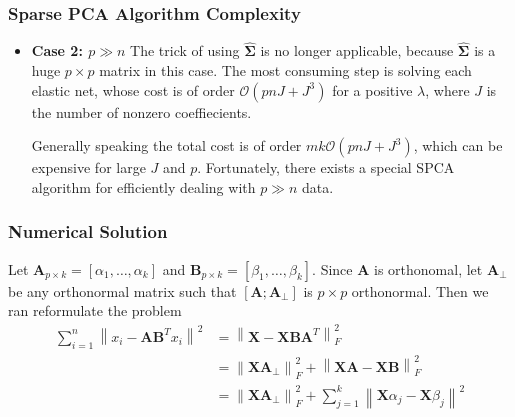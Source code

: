 \documentclass{beamer}
\theoremstyle{plain}
\theoremstyle{definition}
\newcommand{\mat}[1]{\mathbf{#1}}
\newcommand{\norm}[1]{\left\lVert #1 \right\rVert}
\begin{document}
\begin{frame}
\frametitle{Sparse PCA Algorithm Complexity}
\begin{itemize}
\item \textbf{Case 2: $p \gg n$}\linebreak
The trick of using $\hat{\mat \Sigma}$ is no longer applicable, because $\hat{\mat \Sigma}$ is a huge $p \times p$ matrix in this case. The most consuming step is solving each elastic net, whose cost is of order $\mathcal{O}(pnJ + J^3)$ for a positive $\lambda$, where $J$ is the number of nonzero coeffiecients.

Generally speaking the total cost is of order $mk\mathcal{O}(pnJ+J^3)$, which can be expensive for large $J$ and $p$. Fortunately, there exists a special SPCA algorithm for efficiently dealing with $p \gg n$ data.
\end{itemize}
\end{frame}

\begin{frame}
\frametitle{Numerical Solution}
Let $\mat{A}_{p \times k} = \left[ \alpha_1, \ldots , \alpha_k\right]$ and $\mat{B}_{p \times k} = \left[ \beta_1, \ldots , \beta_k\right]$. Since $\mat A$ is orthonomal, let $\mat A_{\perp}$ be any orthonormal matrix such that $\left[ \mat A ; \mat A_{\perp} \right]$ is $p \times p$ orthonormal. Then we ran reformulate the problem
\begin{align*}
\sum_{i=1}^{n} \norm{x_i - \mat{A}\mat{B}^Tx_i}^2 & = \norm{\mat{X} - \mat{X} \mat{B} \mat{A}^T}_F^2\\
& = \norm{\mat X \mat A_{\perp}}_F^2 + \norm{\mat X \mat A - \mat X \mat B}_F^2\\
& = \norm{\mat X \mat A_{\perp}}_F^2 + \sum_{j=1}^{k} \norm{\mat X \alpha_j - \mat X \beta_j}^2
\end{align*}

\end{frame}
\end{document}
